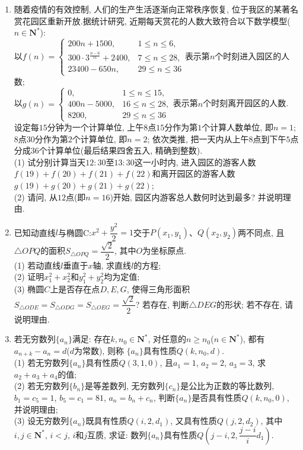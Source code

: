 \documentclass[10pt,a4paper]{article}
\begin{document}
\begin{enumerate}[1.]
\item 随着疫情的有效控制, 人们的生产生活逐渐向正常秩序恢复, 位于我区的某著名赏花园区重新开放.据统计研究, 近期每天赏花的人数大致符合以下数学模型($n\in \mathbf{N}^*$):\\
以$f(n)=\begin{cases}
200n+1500, & 1\le n\le 6,  \\ 300\cdot 3^{\frac{n-6}{11}}+2400, & 7\le n\le 28,  \\ 23400-650n, & 29\le n\le 36 \end{cases}$表示第$n$个时刻进入园区的人数;\\
以$g(n)=\begin{cases}
0, & 1\le n\le 15,  \\ 400n-5000, & 16\le n\le 28,  \\ 8200, & 29\le n\le 36  \end{cases}$表示第$n$个时刻离开园区的人数.\\
设定每$15$分钟为一个计算单位, 上午$8$点$15$分作为第$1$个计算人数单位, 即$n=1$; $8$点$30$分作为第$2$个计算单位, 即$n=2$; 依次类推, 把一天内从上午$8$点到下午$5$点分成$36$个计算单位(最后结果四舍五入, 精确到整数).\\
(1) 试分别计算当天$12: 30$至$13: 30$这一小时内, 进入园区的游客人数$f(19)+f(20)+f(21)+f(22)$和离开园区的游客人数$g(19)+g(20)+g(21)+g(22)$;\\
(2) 请问, 从$12$点(即$n=16$)开始, 园区内游客总人数何时达到最多? 并说明理由.
\item 已知动直线$l$与椭圆C:$x^2+\dfrac{y^2}2=1$交于$P(x_1,y_1)$、$Q(x_2,y_2)$两不同点, 且$\triangle OPQ$的面积$S_{\triangle OPQ}=\dfrac{\sqrt 2}2$, 其中$O$为坐标原点.\\
(1) 若动直线$l$垂直于$x$轴, 求直线$l$的方程;\\
(2) 证明$x_1^2+x_2^2$和$y_1^2+y_2^2$均为定值;\\
(3) 椭圆$C$上是否存在点$D,E,G$, 使得三角形面积$S_{\triangle ODE}=S_{\triangle ODG}=S_{\triangle OEG}=\dfrac{\sqrt 2}2$? 若存在, 判断$\triangle DEG$的形状; 若不存在, 请说明理由.
\item 若无穷数列$\{a_n\}$满足: 存在$k,n_0\in \mathbf{N}^*$, 对任意的$n\ge n_0$($n\in \mathbf{N}^*$), 都有$a_{n+k}-a_n=d$($d$为常数), 则称 $\{a_n\}$具有性质$Q(k,n_0,d)$.\\
(1) 若无穷数列$\{a_n\}$具有性质$Q(3,1,0)$, 且$a_1=1$, $a_2=2$, $a_3=3$, 求$a_2+a_3+a_4$的值;\\
(2) 若无穷数列$\{b_n\}$是等差数列, 无穷数列$\{c_n\}$是公比为正数的等比数列, $b_1=c_5=1$, $b_5=c_1=81$, $a_n=b_n+c_n$, 判断$\{a_n\}$是否具有性质$Q(k,n_0,0)$, 并说明理由;\\
(3) 设无穷数列$\{a_n\}$既具有性质$Q(i,2,d_1)$, 又具有性质$Q(j,2,d_2)$, 其中$i,j\in \mathbf{N}^*$, $i<j$, $i$和$j$互质, 求证: 数列$\{a_n\}$具有性质$Q(j-i,2,\dfrac{j-i}id_1)$.



\end{enumerate}
\end{document}
